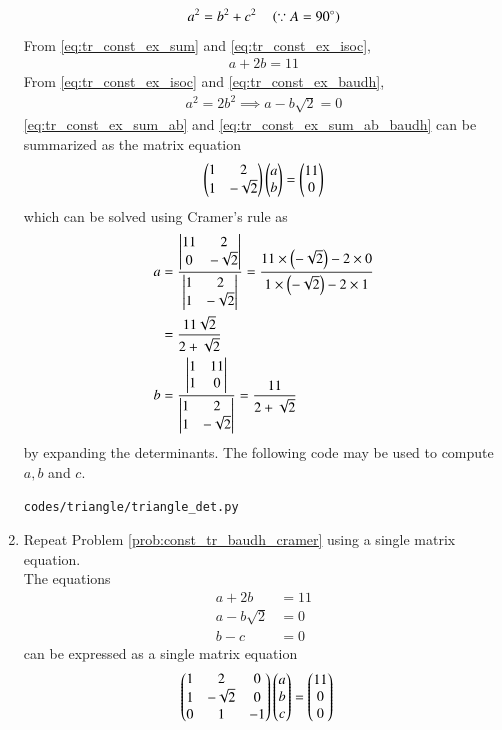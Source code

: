 \begin{enumerate}[label=\arabic*.,ref=\thesubsection.\theenumi]
\begin{align}
a^2 = b^2+c^2 \quad \left(\because A = 90\degree\right)
\label{eq:tr_const_ex_baudh}
\end{align}
%
From \eqref{eq:tr_const_ex_sum} and \eqref{eq:tr_const_ex_isoc},
\begin{align}
\label{eq:tr_const_ex_sum_ab}
a + 2b = 11
\end{align}
From  \eqref{eq:tr_const_ex_isoc} and \eqref{eq:tr_const_ex_baudh},
\begin{align}
\label{eq:tr_const_ex_sum_ab_baudh}
a^2 = 2b^2 \implies a - b\sqrt{2} =0
\end{align}
\eqref{eq:tr_const_ex_sum_ab} and \eqref{eq:tr_const_ex_sum_ab_baudh}
can be summarized as the matrix equation 
\begin{align}
\label{eq:tr_const_ex_sum_ab_mat}
\begin{pmatrix}1 & 2\\1 & -\sqrt{2}\end{pmatrix}\begin{pmatrix}a\\b\end{pmatrix} = \begin{pmatrix}11\\0\end{pmatrix}
\end{align}
%
which can be solved using Cramer's rule as
\begin{align}
\label{eq:tr_const_ex_sum_ab_mat_sol}
a &= \frac{\begin{vmatrix}11 & 2\\0 & -\sqrt{2}\end{vmatrix}}{\begin{vmatrix}1 & 2\\1 & -\sqrt{2}\end{vmatrix}} = \frac{11 \times \left(-\sqrt{2}\right)-2\times 0}{1\times \left(-\sqrt{2}\right) - 2 \times 1} 
\\
&= \frac{11\sqrt{2}}{2+\sqrt{2}}
\\
b &= \frac{\begin{vmatrix}1 & 11\\1 & 0\end{vmatrix}}{\begin{vmatrix}1 & 2\\1 & -\sqrt{2}\end{vmatrix}} = \frac{11}{2+\sqrt{2}}
\end{align}
%
by expanding the determinants.  The following code may be used to compute $a, b$ and $c$.
\begin{lstlisting}
codes/triangle/triangle_det.py
\end{lstlisting}
\item Repeat Problem \ref{prob:const_tr_baudh_cramer} using a single matrix equation.
\\
\solution The equations 
\begin{align}
\label{eq:tr_const_ex_sum_abc}
a + 2b &= 11
\\
a - b\sqrt{2} &=0
\\
b-c &=0
\end{align}
can be expressed as a single matrix equation
\begin{align}
\label{eq:tr_const_ex_sum_abc_mat}
\myvec{1 & 2 & 0\\1 & -\sqrt{2} & 0\\0 & 1 & -1} \myvec{a\\b\\c} &= \myvec{11\\0\\0}

\end{align}
\end{enumerate}

